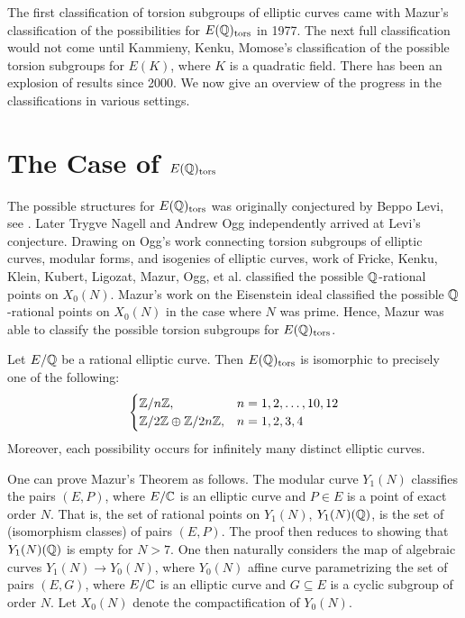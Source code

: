 The first classification of torsion subgroups of elliptic curves came with Mazur's classification of the possibilities for $E(\mathbb{Q})_{\text{tors}}$ in 1977. The next full classification would not come until Kammieny, Kenku, Momose's classification of the possible torsion subgroups for $E(K)$, where $K$ is a quadratic field. There has been an explosion of results since 2000. We now give an overview of the progress in the classifications in various settings. 





\section{The Case of $E(\mathbb{Q})_{\text{tors}}$}

The possible structures for $E(\mathbb{Q})_{\text{tors}}$ was originally conjectured by Beppo Levi, see \cite{schoof96}. Later Trygve Nagell and Andrew Ogg independently arrived at Levi's conjecture. Drawing on Ogg's work connecting torsion subgroups of elliptic curves, modular forms, and isogenies of elliptic curves, work of Fricke, Kenku, Klein, Kubert, Ligozat, Mazur, Ogg, et al. classified the possible $\mathbb{Q}$-rational points on $X_0(N)$. Mazur's work on the Eisenstein ideal classified the possible $\mathbb{Q}$-rational points on $X_0(N)$ in the case where $N$ was prime. Hence, Mazur was able to classify the possible torsion subgroups for $E(\mathbb{Q})_{\text{tors}}$. 


\begin{thm} \label{thm:mazurclassification}
Let $E/\mathbb{Q}$ be a rational elliptic curve. Then $E(\mathbb{Q})_{\text{tors}}$ is isomorphic to precisely one of the following:
	\[
	\begin{cases}
	\mathbb{Z}/n\mathbb{Z}, & n= 1, 2, \ldots, 10, 12 \\
	\mathbb{Z}/2\mathbb{Z} \oplus \mathbb{Z}/2n\mathbb{Z}, & n= 1, 2, 3, 4
	\end{cases}
	\]
Moreover, each possibility occurs for infinitely many distinct elliptic curves. 
\end{thm}


One can prove Mazur's Theorem as follows. The modular curve $Y_1(N)$ classifies the pairs $(E, P)$, where $E/\mathbb{C}$ is an elliptic curve and $P \in E$ is a point of exact order $N$. That is, the set of rational points on $Y_1(N)$, $Y_1(N)(\mathbb{Q})$, is the set of (isomorphism classes) of pairs $(E,P)$. The proof then reduces to showing that $Y_1(N)(\mathbb{Q})$ is empty for $N > 7$. One then naturally considers the map of algebraic curves $Y_1(N) \to Y_0(N)$, where $Y_0(N)$ affine curve parametrizing the set of pairs $(E,G)$, where $E/\mathbb{C}$ is an elliptic curve and $G \subseteq E$ is a cyclic subgroup of order $N$. Let $X_0(N)$ denote the compactification of $Y_0(N)$. 


